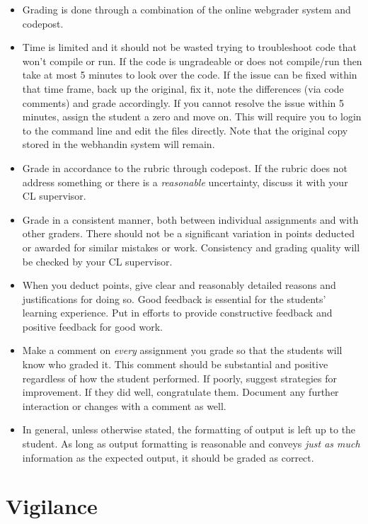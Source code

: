 \documentclass[12pt]{scrartcl}
\begin{document}
\begin{itemize}
  \item Grading is done through a combination of the online webgrader system
    and codepost.    
  \item Time is limited and it should not be wasted trying to troubleshoot 
    code that won't compile or run.  If the code is ungradeable or does not
    compile/run then take at most 5 minutes to look over
    the code.  If the issue can be fixed within that time frame, back up the
    original, fix it, note the differences (via code comments) and grade 
    accordingly.  If you cannot resolve the issue within 5 minutes, assign
    the student a zero and move on.  This will require you to login to the
    command line and edit the files directly.  Note that the original copy
    stored in the webhandin system will remain.
  \item Grade in accordance to the rubric through codepost.  If the rubric 
    does not address something or there is a \emph{reasonable} uncertainty, 
    discuss it with your CL supervisor.
  \item Grade in a consistent manner, both between individual assignments and
    with other graders.  There should not be a significant variation in
    points deducted or awarded for similar mistakes or work.  Consistency 
    and grading quality will be checked by your CL supervisor.
  \item When you deduct points, give clear and reasonably detailed reasons
    and justifications for doing so.  Good feedback is essential for the
    students' learning experience.  Put in efforts to provide constructive
    feedback and positive feedback for good work.
  \item Make a comment on \emph{every} assignment you grade so that the students
    will know who graded it.  This comment should be substantial and positive 
    regardless of how the student performed.  If poorly, suggest strategies 
    for improvement.  If they did well, congratulate them.  Document any further
    interaction or changes with a comment as well.
  \item In general, unless otherwise stated, the formatting of output is
    left up to the student.  As long as output formatting is reasonable and
    conveys \emph{just as much} information as the expected output, it should
    be graded as correct.
\end{itemize}

\section*{Vigilance}
\end{document}
